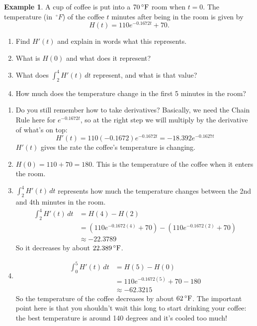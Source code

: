 \documentclass[oneside]{book}
\theoremstyle{definition}
\newtheorem{example}{Example}
\theoremstyle{solution}
\newtheorem*{solution}{Solution}
\newenvironment{solution}{\vspace{2in}\comment}{\endcomment}
\begin{document}
 \begin{example}
   A cup of coffee is put into a $\unit[70]{^\circ F}$ room when
   $t = 0$.  The temperature (in~$\unit{^\circ F}$) of the coffee $t$
   minutes after being in the room is given by
$$ 
H(t) = 110e^{-0.1672t} + 70.
$$
\begin{enumerate}
\item Find $H'(t)$ and explain in words what this represents.
\item What is $H(0)$ and what does it represent?
\item What does $\int_2^4 H'(t)\,dt$ represent, and what is
  that value?
\item How much does the temperature change in the first 5
  minutes in the room?
\end{enumerate}
\end{example}
  
\begin{solution}
  \begin{enumerate}
  \item Do you still remember how to take derivatives?  Basically, we
    need the Chain Rule here for $e^{-0.1672t}$, so at the right step
    we will multiply by the derivative of what's on top:
$$ 
H'(t) = 110(-0.1672)e^{-0.1672 t} = -18.392e^{-0.1627t}
$$ 
$H'(t)$ gives the rate the coffee's temperature is changing.

\item $H(0) = 110 + 70 = 180$.  This is the temperature of the coffee
  when it enters the room.

\item $\int_2^4 H'(t)\,dt$ represents how much the temperature changes
  between the 2nd and 4th minutes in the room.
  \begin{align*}
    \int_2^4 H'(t)\,dt &= H(4) - H(2) \\ 
                       & =   \left(110e^{-0.1672(4)} + 70\right) - \left(110e^{-0.1672(2)} + 70
                         \right) \\ 
                       &\approx -22.3789
    \end{align*} 
    So it decreases by about $\unit[22.389]{^\circ F}$.

  \item
    \begin{align*} 
      \int_0^5 H'(t)\, dt & = H(5) - H(0) \\ 
                          & = 110 e^{-0.1672(5)} + 70 - 180\\ 
                          & \approx -62.3215
    \end{align*} 
    So the temperature of the coffee decreases by about
    $\unit[62]{^\circ F}$.  The important point here is that you
    shouldn't wait this long to start drinking your coffee: the best
    temperature is around 140 degrees and it's cooled too much!
  \end{enumerate}
\end{solution}
\end{document}
